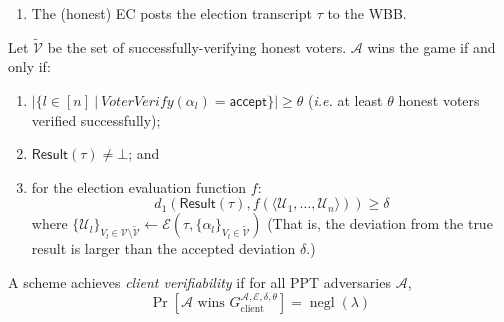 \documentclass[12pt,a4paper]{article}
\DeclareMathOperator{\negl}{\text{negl}}
\theoremstyle{definition}
\newcommand{\ie}{\textit{i.e. }}
\begin{document}
\begin{definition}
\begin{enumerate}
        \item The (honest) EC posts the election transcript $\tau$ to the WBB.
    \end{enumerate}
    Let $\tilde{\mathcal{V}}$ be the set of successfully-verifying honest voters. $\mathcal{A}$ wins the game if and only if:
    \begin{enumerate}
        \item $|\{l\in [n]\ |\ \mathit{VoterVerify}(\alpha_l)=\mathsf{accept}\}| \geq \theta$ (\ie at least $\theta$ honest voters verified successfully);
        \item $\mathsf{Result}(\tau)\neq\bot$; and
        \item for the election evaluation function $f$:
                    $$d_1(\mathsf{Result}(\tau), f(\langle\mathcal{U}_1,\ldots,\mathcal{U}_n\rangle)) \geq \delta$$
            where $\{\mathcal{U}_l\}_{V_l \in \mathcal{V} \setminus \tilde{\mathcal{V}}} \leftarrow \mathcal{E}(\tau, \{\alpha_l \}_{V_l \in \tilde{\mathcal{V}}})$
            (That is, the deviation from the true result is larger than the accepted deviation $\delta$.)
    \end{enumerate}
    A scheme achieves \textit{client verifiability} if for all PPT adversaries $\mathcal{A}$, $$\Pr\left[\mathcal{A}\text{ wins }G_\text{client}^{\mathcal{A},\mathcal{E},\delta,\theta}\right]=\negl(\lambda)$$
\end{definition}
\end{document}

